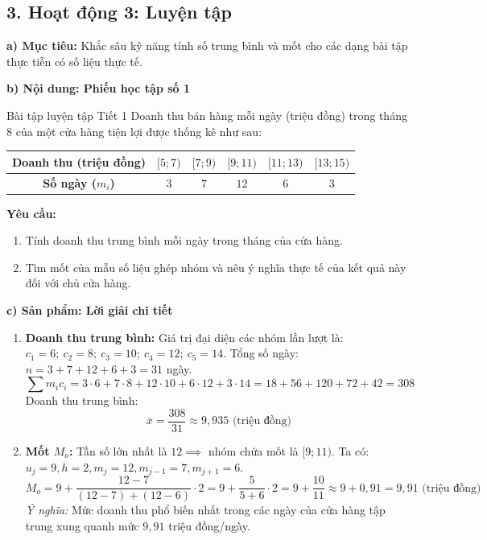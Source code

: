 \documentclass[12pt, a4paper]{article}
\begin{document}
\subsection*{3. Hoạt động 3: Luyện tập}

\noindent \textbf{a) Mục tiêu:}
Khắc sâu kỹ năng tính số trung bình và mốt cho các dạng bài tập thực tiễn có số liệu thực tế.

\noindent \textbf{b) Nội dung: Phiếu học tập số 1}
\begin{pedabox}{Bài tập luyện tập Tiết 1}
Doanh thu bán hàng mỗi ngày (triệu đồng) trong tháng 8 của một cửa hàng tiện lợi được thống kê như sau:
\begin{center}
\small
\begin{tabular}{|c|c|c|c|c|c|}
\hline
\textbf{Doanh thu (triệu đồng)} & $[5; 7)$ & $[7; 9)$ & $[9; 11)$ & $[11; 13)$ & $[13; 15)$ \\ \hline
\textbf{Số ngày ($m_i$)} & $3$ & $7$ & $12$ & $6$ & $3$ \\ \hline
\end{tabular}
\end{center}
\textbf{Yêu cầu:}
\begin{enumerate}[leftmargin=0.6cm]
    \item Tính doanh thu trung bình mỗi ngày trong tháng của cửa hàng.
    \item Tìm mốt của mẫu số liệu ghép nhóm và nêu ý nghĩa thực tế của kết quả này đối với chủ cửa hàng.
\end{enumerate}
\end{pedabox}

\noindent \textbf{c) Sản phẩm: Lời giải chi tiết}
\begin{enumerate}[leftmargin=0.6cm]
    \item \textbf{Doanh thu trung bình:}
    Giá trị đại diện các nhóm lần lượt là: $c_1 = 6; \ c_2 = 8; \ c_3 = 10; \ c_4 = 12; \ c_5 = 14$.
    Tổng số ngày: $n = 3 + 7 + 12 + 6 + 3 = 31$ ngày.
    $$\sum m_i c_i = 3 \cdot 6 + 7 \cdot 8 + 12 \cdot 10 + 6 \cdot 12 + 3 \cdot 14 = 18 + 56 + 120 + 72 + 42 = 308$$
    Doanh thu trung bình:
    $$\bar{x} = \dfrac{308}{31} \approx 9{,}935\text{ (triệu đồng)}$$
    \item \textbf{Mốt $M_o$:}
    Tần số lớn nhất là $12 \implies$ nhóm chứa mốt là $[9; 11)$.
    Ta có: $u_j = 9, h = 2, m_j = 12, m_{j-1} = 7, m_{j+1} = 6$.
    $$M_o = 9 + \dfrac{12 - 7}{(12 - 7) + (12 - 6)} \cdot 2 = 9 + \dfrac{5}{5 + 6} \cdot 2 = 9 + \dfrac{10}{11} \approx 9 + 0{,}91 = 9{,}91\text{ (triệu đồng)}$$
    \textit{Ý nghĩa:} Mức doanh thu phổ biến nhất trong các ngày của cửa hàng tập trung xung quanh mức $9{,}91$ triệu đồng/ngày.
\end{enumerate}
\end{document}
